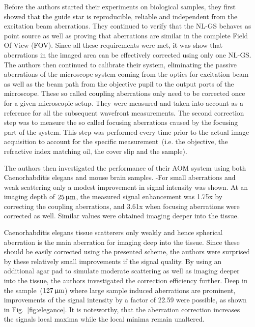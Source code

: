 Before the authors started their experiments on biological samples, they first showed that the guide star is reproducible, reliable and independent from the excitation beam aberrations. They continued to verify that the NL-GS behaves as point source as well as proving that aberrations are similar in the complete Field Of View (FOV). Since all these requirements were met, it was show that aberrations in the imaged area can be effectively corrected using only one NL-GS. The authors then continued to calibrate their system, eliminating the passive aberrations of the microscope system coming from the optics for excitation beam as well as the beam path from the objective pupil to the output ports of the microscope. These so called coupling aberrations only need to be corrected once for a given microscopic setup. They were measured and taken into account as a reference for all the subsequent wavefront measurements. The second correction step was to measure the so called focusing aberrations caused by the focusing part of the system. This step was performed every time prior to the actual image acquisition to account for the specific measurement~(i.e. the objective, the refractive index matching oil, the cover slip and the sample).\newline

The authors then investigated the performance of their AOM system using both Caenorhabditis elegans and mouse brain samples. -For small aberrations and weak scattering only a modest improvement in signal intensity was shown. At an imaging depth of $\unit[25]{\upmu m}$, the  measured signal enhancement was 1.75x by correcting the coupling aberrations, and 3.61x when focusing aberrations were corrected as well. Similar values were obtained imaging deeper into the tissue. 

Caenorhabditis elegans tissue scatterers only weakly and hence spherical aberration is the main aberration for imaging deep into the tissue. Since these should be easily corrected using the presented scheme, the authors were surprised by these relatively small improvements if the signal quality. By using an additional agar pad to simulate moderate scattering as well as imaging deeper into the tissue, the authors investigated the correction efficiency further. Deep in the sample~($\unit[127]{\upmu m}$) where large sample induced aberrations are prominent, improvements of the signal intensity by a factor of 22.59 were possible, as shown in Fig.~\ref{fig:elegance}. It is noteworthy, that the aberration correction increases the signals local maxima while the local minima remain unaltered. 

